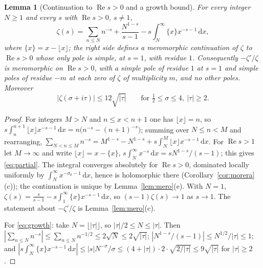 \documentclass[11pt]{article}
\newtheorem{lemma}[theorem]{Lemma}
\theoremstyle{definition}
\newcommand{\re}{\operatorname{Re}}
\newcommand{\dd}{\,\mathrm{d}}
\begin{document}
\begin{lemma}[Continuation to $\re s>0$ and a growth bound]\label{lem:continuation}
For every integer $N\ge1$ and every $s$ with $\re s>0$, $s\ne1$,
\begin{equation}\label{eq:partial}
\zeta(s)=\sum_{n\le N}n^{-s}+\frac{N^{1-s}}{s-1}-s\int_N^\infty\{x\}x^{-s-1}\dd x,
\end{equation}
where $\{x\}=x-\lfloor x\rfloor$; the right side defines a meromorphic continuation of $\zeta$ to $\re s>0$ whose only pole is simple, at $s=1$, with residue $1$.
Consequently $-\zeta'/\zeta$ is meromorphic on $\re s>0$, with a simple pole of residue $1$ at $s=1$ and simple poles of residue $-m$ at each zero of $\zeta$ of multiplicity $m$, and no other poles.
Moreover
\begin{equation}\label{eq:growth}
|\zeta(\sigma+i\tau)|\le 12\sqrt{|\tau|}\qquad\text{for }\tfrac12\le\sigma\le4,\ |\tau|\ge2.
\end{equation}
\end{lemma}
\begin{proof}
For integers $M>N$ and $n\le x<n+1$ one has $\lfloor x\rfloor=n$, so $s\int_n^{n+1}\lfloor x\rfloor x^{-s-1}\dd x=n\bigl(n^{-s}-(n+1)^{-s}\bigr)$; summing over $N\le n<M$ and rearranging,
$\sum_{N<n\le M}n^{-s}=M^{1-s}-N^{1-s}+s\int_N^M\lfloor x\rfloor x^{-s-1}\dd x$.
For $\re s>1$ let $M\to\infty$ and write $\lfloor x\rfloor=x-\{x\}$, $s\int_N^\infty x^{-s}\dd x=sN^{1-s}/(s-1)$; this gives \eqref{eq:partial}.
The integral converges absolutely for $\re s>0$, dominated locally uniformly by $\int_N^\infty x^{-\sigma_0-1}\dd x$, hence is holomorphic there (Corollary~\ref{cor:morera}(c)); the continuation is unique by Lemma~\ref{lem:mero}(e).
With $N=1$, $\zeta(s)=\frac{s}{s-1}-s\int_1^\infty\{x\}x^{-s-1}\dd x$, so $(s-1)\zeta(s)\to1$ as $s\to1$.
The statement about $-\zeta'/\zeta$ is Lemma~\ref{lem:mero}(c).

For \eqref{eq:growth}: take $N=\lfloor|\tau|\rfloor$, so $|\tau|/2\le N\le|\tau|$.
Then $|\sum_{n\le N}n^{-s}|\le\sum_{n\le N}n^{-1/2}\le 2\sqrt N\le2\sqrt{|\tau|}$;
$|N^{1-s}/(s-1)|\le N^{1/2}/|\tau|\le 1$;
and $|s\int_N^\infty\{x\}x^{-s-1}\dd x|\le|s|N^{-\sigma}/\sigma\le(4+|\tau|)\cdot2\cdot\sqrt{2/|\tau|}\le 9\sqrt{|\tau|}$ for $|\tau|\ge 2$.
\end{proof}
\end{document}
